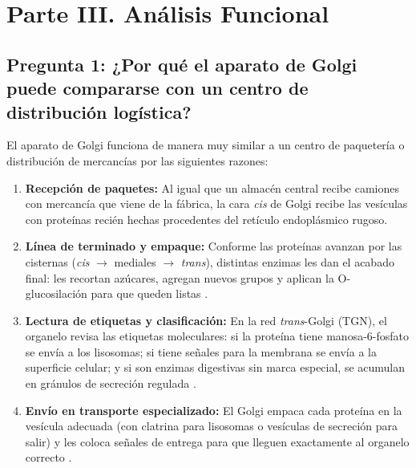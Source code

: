 \documentclass[12pt,spanish,letterpaper,oneside]{article}
\begin{document}
\section{Parte III. Análisis Funcional}

\subsection{Pregunta 1: ¿Por qué el aparato de Golgi puede compararse con un centro de distribución logística?}
El aparato de Golgi funciona de manera muy similar a un centro de paquetería o distribución de mercancías por las siguientes razones:
\begin{enumerate}
    \item \textbf{Recepción de paquetes:} Al igual que un almacén central recibe camiones con mercancía que viene de la fábrica, la cara \textit{cis} de Golgi recibe las vesículas con proteínas recién hechas procedentes del retículo endoplásmico rugoso.
    \item \textbf{Línea de terminado y empaque:} Conforme las proteínas avanzan por las cisternas (\textit{cis} $\to$ mediales $\to$ \textit{trans}), distintas enzimas les dan el acabado final: les recortan azúcares, agregan nuevos grupos y aplican la O-glucosilación para que queden listas \parencite{mathews2013bioquimica, fortoul2020histologia}.
    \item \textbf{Lectura de etiquetas y clasificación:} En la red \textit{trans}-Golgi (TGN), el organelo revisa las etiquetas moleculares: si la proteína tiene manosa-6-fosfato se envía a los lisosomas; si tiene señales para la membrana se envía a la superficie celular; y si son enzimas digestivas sin marca especial, se acumulan en gránulos de secreción regulada \parencite{alberts2022molecular, lodish2021molecular}.
    \item \textbf{Envío en transporte especializado:} El Golgi empaca cada proteína en la vesícula adecuada (con clatrina para lisosomas o vesículas de secreción para salir) y les coloca señales de entrega para que lleguen exactamente al organelo correcto \parencite{karp2019biologia}.
\end{enumerate}
\end{document}
